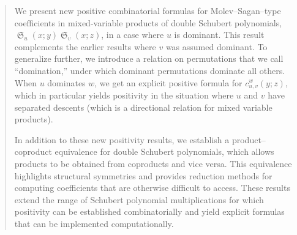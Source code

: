 \documentclass{amsart}
\theoremstyle{definition}
\theoremstyle{remark}
\numberwithin{equation}{subsection}
\DeclareMathOperator{\sch}{\mathfrak{S}}
\begin{document}

\begin{abstract}
	We present new positive combinatorial formulas for Molev--Sagan--type coefficients in mixed-variable products of double Schubert polynomials, $\sch_u(x;y)\sch_v(x;z)$, in a case where $u$ is dominant. This result complements the earlier results where $v$ was assumed dominant. To generalize further, we introduce a relation on permutations that we call ``domination,'' under which dominant permutations dominate all others. When $u$ dominates $w$, we get an explicit positive formula for $c^w_{u,v}(y;z)$, which in particular yields positivity in the situation where $u$ and $v$ have separated descents (which is a directional relation for mixed variable products).
	
	In addition to these new positivity results, we establish a product--coproduct equivalence for double Schubert polynomials, which allows products to be obtained from coproducts and vice versa. This equivalence highlights structural symmetries and provides reduction methods for computing coefficients that are otherwise difficult to access. These results extend the range of Schubert polynomial multiplications for which positivity can be established combinatorially and yield explicit formulas that can be implemented computationally.

\end{abstract}
\end{document}
